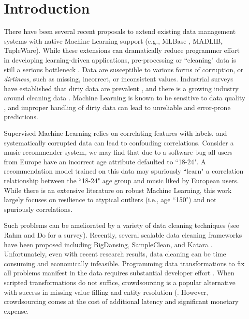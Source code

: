 \section{Introduction}
There have been several recent proposals to extend existing data management systems with native Machine Learning support (e.g., MLBase \cite{kraska2013mlbase}, MADLIB\cite{hellerstein2012madlib}, TupleWare\cite{crotty2014tupleware}).
While these extensions can dramatically reduce programmer effort in developing learning-driven applications, pre-processing or ``cleaning" data is still a serious bottleneck \cite{kandel2012}. 
Data are susceptible to various forms of corruption, or \emph{dirtiness}, such as missing, incorrect, or inconsistent values.
Industrial surveys have established that dirty data are prevalent \cite{Gartner}, and there is a growing industry around cleaning data \cite{fortunearticle}.
Machine Learning is known to be sensitive to data quality \cite{xiaofeature}, and improper handling of dirty data can lead to unreliable and error-prone predictions.

Supervised Machine Learning relies on correlating features with labels, and systematically corrupted data can lead to confouding correlations.
Consider a music recommender system, we may find that due to a software bug all users from Europe have an incorrect age attribute defaulted to ``18-24".
A recommendation model trained on this data may spuriously ``learn" a correlation relationship between the ``18-24" age group and music liked by European users.
While there is an extensive literature on robust Machine Learning, this work largely focuses on resilience to atypical outliers (i.e., age ``150") and not spuriously correlations.

Such problems can be ameliorated by a variety of data cleaning techniques (see Rahm and Do \cite{rahm2000data} for a survey).
Recently, several scalable data cleaning frameworks have been proposed including BigDansing\cite{khayyat2015bigdansing}, SampleClean\cite{sampleclean}, and Katara \cite{chu2015katara}. 
Unfortunately, even with recent research results, data cleaning can be time consuming and economically infeasible\cite{wang1999sample}.
Programming data transformations to fix all problems manifest in the data requires substantial developer effort \cite{kandel2012}.
When scripted transformations do not suffice, crowdsourcing is a popular alternative with success in missing value filling and entity resolution (\cite{gokhale2014corleone, park2014crowdfill, sampleclean,chu2015katara}.
However, crowdsourcing comes at the cost of additional latency and significant monetary expense.

